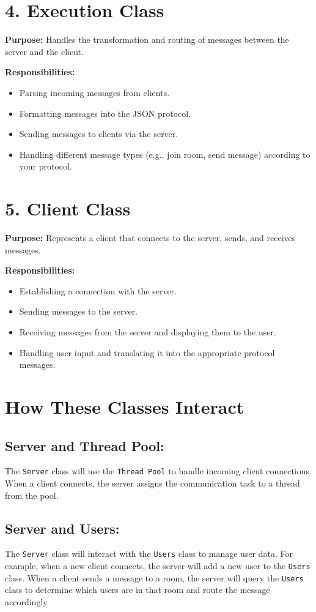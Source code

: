 \documentclass{article}
\begin{document}
\section*{4. Execution Class}
\textbf{Purpose:} Handles the transformation and routing of messages between the server and the client.

\textbf{Responsibilities:}
\begin{itemize}
    \item Parsing incoming messages from clients.
    \item Formatting messages into the JSON protocol.
    \item Sending messages to clients via the server.
    \item Handling different message types (e.g., join room, send message) according to your protocol.
\end{itemize}

\section*{5. Client Class}
\textbf{Purpose:} Represents a client that connects to the server, sends, and receives messages.

\textbf{Responsibilities:}
\begin{itemize}
    \item Establishing a connection with the server.
    \item Sending messages to the server.
    \item Receiving messages from the server and displaying them to the user.
    \item Handling user input and translating it into the appropriate protocol messages.
\end{itemize}

\section*{How These Classes Interact}

\subsection*{Server and Thread Pool:}
The \texttt{Server} class will use the \texttt{Thread Pool} to handle incoming client connections. When a client connects, the server assigns the communication task to a thread from the pool.

\subsection*{Server and Users:}
The \texttt{Server} class will interact with the \texttt{Users} class to manage user data. For example, when a new client connects, the server will add a new user to the \texttt{Users} class. When a client sends a message to a room, the server will query the \texttt{Users} class to determine which users are in that room and route the message accordingly.
\end{document}
